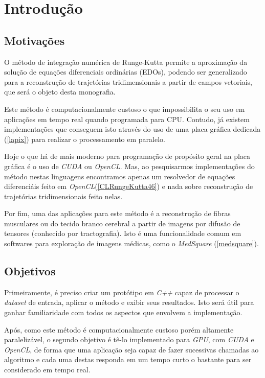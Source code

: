 \chapter{Introdução}

\section{Motivações}
O método de integração numérica de Runge-Kutta permite a aproximação da solução de equações diferenciais ordinárias (EDOs), podendo ser generalizado para a reconstrução de trajetórias tridimensionais a partir de campos vetoriais, que será o objeto desta monografia.

Este método é computacionalmente custoso o que impossibilita o seu uso em aplicações em tempo real quando programada para CPU. Contudo, já existem implementações que conseguem isto através do uso de uma placa gráfica dedicada (\ref{lapix}) para realizar o processamento em paralelo.

Hoje o que há de mais moderno para programação de propósito geral na placa gráfica é o uso de \textit{CUDA} ou \textit{OpenCL}. Mas, ao pesquisarmos implementações do método nestas linguagens encontramos apenas um resolvedor de equações diferenciáis feito em \textit{OpenCL}(\ref{CLRungeKutta46}) e nada sobre reconstrução de trajetórias tridimensionais feito nelas.

Por fim, uma das aplicações para este método é a reconstrução de fibras musculares ou do tecido branco cerebral a partir de imagens por difusão de tensores (conhecido por tractografia). Isto é uma funcionalidade comum em softwares para exploração de imagens médicas, como o \textit{MedSquare} (\ref{medsquare}).

\section{Objetivos}
Primeiramente, é preciso criar um protótipo em \textit{C++} capaz de processar o \textit{dataset} de entrada, aplicar o método e exibir seus resultados. Isto será útil para ganhar familiaridade com todos os aspectos que envolvem a implementação.

\newpage
Após, como este método é computacionalmente custoso porém altamente paralelizável, o segundo objetivo é tê-lo implementado para \textit{GPU}, com \textit{CUDA} e \textit{OpenCL}, de forma que uma aplicação seja capaz de fazer sucessivas chamadas ao algoritmo e cada uma destas responda em um tempo curto o bastante para ser considerado em tempo real.

